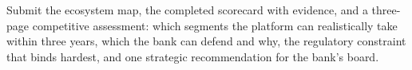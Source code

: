 \begin{labdeliverable}
Submit the ecosystem map, the completed scorecard with evidence, and a three-page competitive assessment: which segments the platform can realistically take within three years, which the bank can defend and why, the regulatory constraint that binds hardest, and one strategic recommendation for the bank's board.
\end{labdeliverable}
